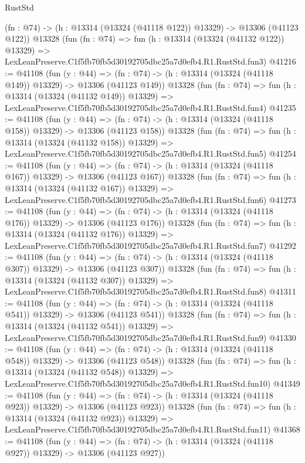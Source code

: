 \begin{lexlean}{RustStd}
\begin{coremodule}
    (fn : @74) -> (h : @13314 (@13324 (@41118 @122)) @13329) -> @13306 (@41123 @122))
    @13328
    (fun (fn : @74) =>
    fun (h : @13314 (@13324 (@41132 @122)) @13329) =>
    LexLeanPreserve.C1f5fb70fb5d30192705dbc25a7d0efb4.R1.RustStd.fun3)
@41216 := @41108
    (fun (y : @44) =>
    (fn : @74) -> (h : @13314 (@13324 (@41118 @149)) @13329) -> @13306 (@41123 @149))
    @13328
    (fun (fn : @74) =>
    fun (h : @13314 (@13324 (@41132 @149)) @13329) =>
    LexLeanPreserve.C1f5fb70fb5d30192705dbc25a7d0efb4.R1.RustStd.fun4)
@41235 := @41108
    (fun (y : @44) =>
    (fn : @74) -> (h : @13314 (@13324 (@41118 @158)) @13329) -> @13306 (@41123 @158))
    @13328
    (fun (fn : @74) =>
    fun (h : @13314 (@13324 (@41132 @158)) @13329) =>
    LexLeanPreserve.C1f5fb70fb5d30192705dbc25a7d0efb4.R1.RustStd.fun5)
@41254 := @41108
    (fun (y : @44) =>
    (fn : @74) -> (h : @13314 (@13324 (@41118 @167)) @13329) -> @13306 (@41123 @167))
    @13328
    (fun (fn : @74) =>
    fun (h : @13314 (@13324 (@41132 @167)) @13329) =>
    LexLeanPreserve.C1f5fb70fb5d30192705dbc25a7d0efb4.R1.RustStd.fun6)
@41273 := @41108
    (fun (y : @44) =>
    (fn : @74) -> (h : @13314 (@13324 (@41118 @176)) @13329) -> @13306 (@41123 @176))
    @13328
    (fun (fn : @74) =>
    fun (h : @13314 (@13324 (@41132 @176)) @13329) =>
    LexLeanPreserve.C1f5fb70fb5d30192705dbc25a7d0efb4.R1.RustStd.fun7)
@41292 := @41108
    (fun (y : @44) =>
    (fn : @74) -> (h : @13314 (@13324 (@41118 @307)) @13329) -> @13306 (@41123 @307))
    @13328
    (fun (fn : @74) =>
    fun (h : @13314 (@13324 (@41132 @307)) @13329) =>
    LexLeanPreserve.C1f5fb70fb5d30192705dbc25a7d0efb4.R1.RustStd.fun8)
@41311 := @41108
    (fun (y : @44) =>
    (fn : @74) -> (h : @13314 (@13324 (@41118 @541)) @13329) -> @13306 (@41123 @541))
    @13328
    (fun (fn : @74) =>
    fun (h : @13314 (@13324 (@41132 @541)) @13329) =>
    LexLeanPreserve.C1f5fb70fb5d30192705dbc25a7d0efb4.R1.RustStd.fun9)
@41330 := @41108
    (fun (y : @44) =>
    (fn : @74) -> (h : @13314 (@13324 (@41118 @548)) @13329) -> @13306 (@41123 @548))
    @13328
    (fun (fn : @74) =>
    fun (h : @13314 (@13324 (@41132 @548)) @13329) =>
    LexLeanPreserve.C1f5fb70fb5d30192705dbc25a7d0efb4.R1.RustStd.fun10)
@41349 := @41108
    (fun (y : @44) =>
    (fn : @74) -> (h : @13314 (@13324 (@41118 @923)) @13329) -> @13306 (@41123 @923))
    @13328
    (fun (fn : @74) =>
    fun (h : @13314 (@13324 (@41132 @923)) @13329) =>
    LexLeanPreserve.C1f5fb70fb5d30192705dbc25a7d0efb4.R1.RustStd.fun11)
@41368 := @41108
    (fun (y : @44) =>
    (fn : @74) -> (h : @13314 (@13324 (@41118 @927)) @13329) -> @13306 (@41123 @927))

\end{coremodule}
\end{lexlean}
